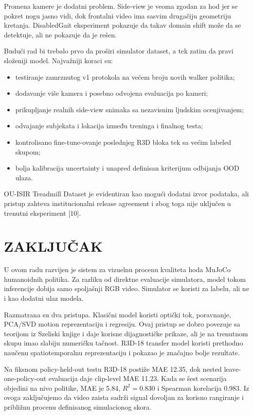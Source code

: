 \documentclass[12pt,a4paper]{report}
\begin{document}
Promena kamere je dodatni problem. Side-view je veoma zgodan za hod jer se
pokret nogu jasno vidi, dok frontalni video ima sasvim drugačiju geometriju
kretanja. DisabledGait eksperiment pokazuje da takav domain shift može da se
detektuje, ali ne pokazuje da je rešen.

Budući rad bi trebalo prvo da proširi simulator dataset, a tek zatim da pravi
složeniji model. Najvažniji koraci su:
\begin{itemize}
  \item testiranje zamrznutog v1 protokola na većem broju novih walker politika;
  \item dodavanje više kamera i posebno odvojena evaluacija po kameri;
  \item prikupljanje realnih side-view snimaka sa nezavisnim ljudskim ocenjivanjem;
  \item odvajanje subjekata i lokacija između treninga i finalnog testa;
  \item kontrolisano fine-tune-ovanje poslednjeg R3D bloka tek sa većim labeled skupom;
  \item bolja kalibracija uncertainty i unapred definisan kriterijum odbijanja OOD ulaza.
\end{itemize}

OU-ISIR Treadmill Dataset je evidentiran kao mogući dodatni izvor podataka, ali
pristup zahteva institucionalni release agreement i zbog toga nije uključen u
trenutni eksperiment [10].

\chapter{ZAKLJUČAK}

U ovom radu razvijen je sistem za vizuelnu procenu kvaliteta hoda MuJoCo
humanoidnih politika. Za razliku od direktne evaluacije simulatora, model tokom
inferencije dobija samo spoljašnji RGB video. Simulator se koristi za labelu,
ali ne i kao dodatni ulaz modela.

Razmatrana su dva pristupa. Klasični model koristi optički tok, poravnanje,
PCA/SVD motion reprezentaciju i regresiju. Ovaj pristup se dobro povezuje sa
teorijom iz Szeliski knjige i daje korisne dijagnostičke prikaze, ali je na
trenutnom skupu imao slabiju numeričku tačnost. R3D-18 transfer model koristi
prethodno naučenu spatiotemporalnu reprezentaciju i pokazao je značajno bolje
rezultate.

Na fiksnom policy-held-out testu R3D-18 postiže MAE 12.35, dok nested
leave-one-policy-out evaluacija daje clip-level MAE 11.23. Kada se šest
scenarija objedini na nivo politike, MAE je 5.84, $R^2=0.830$ i Spearman
korelacija 0.983. Iz ovoga zaključujemo da video zaista sadrži signal dovoljan
za korisno rangiranje i približnu procenu definisanog simulacionog skora.
\end{document}
